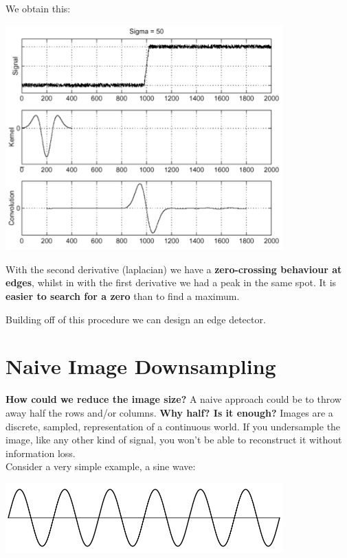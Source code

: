 \documentclass{article}
\begin{document}
We obtain this:
\begin{center}
\includegraphics[width=0.8\textwidth]{images/laplacian_derivative.png}
\end{center}

With the second derivative (laplacian) we have a \textbf{zero-crossing behaviour at edges}, whilst in with the first derivative we had a peak in the same spot. It is \textbf{easier to search for a zero} than to find a maximum.

Building off of this procedure we can design an edge detector.

\newpage

\section*{Naive Image Downsampling}

\textbf{How could we reduce the image size?} A naive approach could be to throw away half the rows and/or columns. \textbf{Why half? Is it enough?} Images are a discrete, sampled, representation of a continuous world. If you undersample the image, like any other kind of signal, you won't be able to reconstruct it without information loss. \\

Consider a very simple example, a sine wave:

\begin{center}
\includegraphics[width=0.8\textwidth]{images/signal_2.png}
\end{center}
\end{document}
